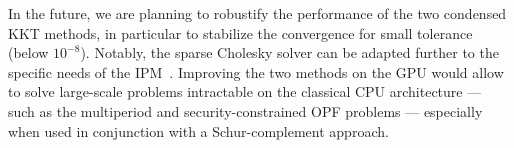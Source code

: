 \documentclass{article}
\theoremstyle{definition}
\theoremstyle{remark}
\begin{document}
In the future, we are planning to robustify the performance of
the two condensed KKT methods, in particular to stabilize the convergence
for small tolerance (below $10^{-8}$). Notably, the sparse Cholesky solver
can be adapted further to the specific needs of the IPM~\cite{wright1999modified}.
Improving the two methods on the GPU would allow to solve large-scale
problems intractable on the classical CPU architecture --- such as the multiperiod
and security-constrained OPF problems --- especially when used in conjunction
with a Schur-complement approach.




\end{document}
